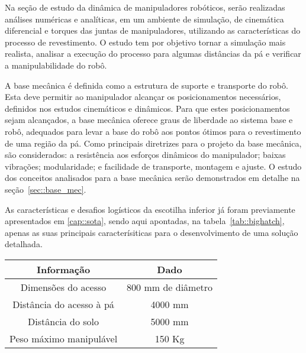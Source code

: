 Na seção de estudo da dinâmica de manipuladores robóticos, serão realizadas
análises numéricas e analíticas, em um ambiente de simulação, de cinemática
diferencial e torques das juntas de manipuladores, utilizando as características
do processo de revestimento. O estudo tem por objetivo tornar a simulação mais
realista, analisar a execução do processo para algumas distâncias da pá
e verificar a manipulabilidade do robô.

A base mecânica é definida como a estrutura de suporte e transporte do robô.
Esta deve permitir ao manipulador alcançar os posicionamentos necessários, 
definidos nos estudos cinemáticos e dinâmicos. Para que estes
posicionamentos sejam alcançados, a base mecânica oferece graus de
liberdade ao sistema base e robô, adequados para levar a base do robô aos pontos
ótimos para o revestimento de uma região da pá. Como principais diretrizes para
o projeto da base mecânica, são considerados: a resistência aos esforços dinâmicos do
manipulador; baixas vibrações; modularidade; e facilidade de transporte,
montagem e ajuste. O estudo dos conceitos analisados para a base mecânica serão
demonstrados em detalhe na seção~\ref{sec::base_mec}.

As características e desafios logísticos da escotilha inferior já foram
previamente apresentados em \ref{cap::sota}, sendo aqui apontadas, na
tabela~\ref{tab::bighatch}, apenas as suas principais caracterísiticas para o
desenvolvimento de uma solução detalhada.

\begin{center}
\begin{tabular}{  c | c  }
  \hline
  \textbf{Informação} & \textbf{Dado} \\ \hline
  Dimensões do acesso & 800 mm de diâmetro  \\ \hline
  Distância do acesso à pá & 4000 mm  \\ \hline
  Distância do solo & 5000 mm \\ \hline
  Peso máximo manipulável & 150 Kg \\
  \hline
\end{tabular}
\label{tab::bighatch}
\end{center}

 



